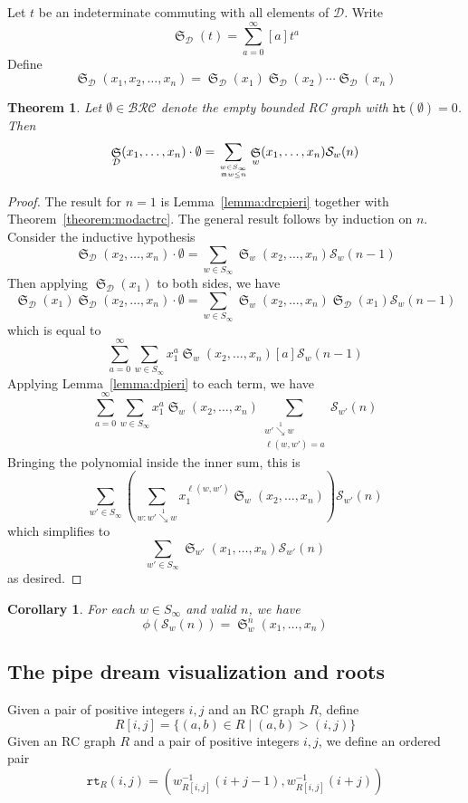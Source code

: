 \documentclass{amsart}
\newtheorem{corollary}[lemma]{Corollary}
\newtheorem{theorem}{Theorem}[section]
\theoremstyle{definition}
\theoremstyle{remark}
\numberwithin{equation}{subsection}
\DeclareMathOperator{\sch}{\mathfrak{S}}
\newcommand{\downvar}[1]{\stackrel{#1}{\searrow}}
\newcommand{\wof}[1]{w_{#1}}
\newcommand{\rtt}{\mathtt{rt}}
\newcommand{\hr}{\mathtt{ht}}
\newcommand{\BRC}{\mathcal{BRC}}
\newcommand{\dcoma}{\mathcal{D}}
\newcommand{\maxd}{\mathfrak{m}}
\begin{document}
Let $t$ be an indeterminate commuting with all elements of $\dcoma$. Write
$$\sch_\dcoma(t) = \sum_{a=0}^\infty [a]t^a$$
Define
$$\sch_\dcoma(x_1,x_2,\ldots,x_n) = \sch_\dcoma(x_1)\sch_\dcoma(x_2)\cdots \sch_\dcoma(x_n)$$

\begin{theorem}
	Let $\emptyset\in \BRC$ denote the empty bounded RC graph with $\hr(\emptyset)=0$. Then
	$$\sch_\dcoma(x_1,\ldots,x_n)\cdot \emptyset=\sum_{w\in S_\infty\atop\maxd{w}\leq n}\sch_w(x_1,\ldots,x_n)\mathcal{S}_w(n)$$
\end{theorem}
\begin{proof}
	The result for $n=1$ is Lemma~\ref{lemma:drcpieri} together with Theorem~\ref{theorem:modactrc}. The general result follows by induction on $n$. Consider the inductive hypothesis
	$$\sch_\dcoma(x_2,\ldots,x_n)\cdot \emptyset=\sum_{w\in S_\infty}\sch_w(x_2,\ldots,x_n)\mathcal{S}_w(n-1)$$
	Then applying $\sch_\dcoma(x_1)$ to both sides, we have
	$$\sch_\dcoma(x_1)\sch_\dcoma(x_2,\ldots,x_n)\cdot \emptyset=\sum_{w\in S_\infty}\sch_w(x_2,\ldots,x_n)\sch_\dcoma(x_1)\mathcal{S}_w(n-1)$$
	which is equal to
	$$\sum_{a=0}^\infty\sum_{w\in S_\infty}x_1^a\sch_w(x_2,\ldots,x_n)[a]\mathcal{S}_w(n-1)$$
	Applying Lemma~\ref{lemma:dpieri} to each term, we have
	$$\sum_{a=0}^\infty\sum_{w\in S_\infty}x_1^a\sch_w(x_2,\ldots,x_n)\sum_{\substack{w'\downvar{1} w\\\ell(w,w')=a}} \mathcal{S}_{w'}(n)$$
	Bringing the polynomial inside the inner sum, this is
	$$\sum_{w'\in S_\infty}\left(\sum_{w:w'\downvar{1}w} x_1^{\ell(w,w')}\sch_w(x_2,\ldots,x_n)\right)\mathcal{S}_{w'}(n)$$
	which simplifies to
	$$\sum_{w'\in S_\infty}\sch_{w'}(x_1,\ldots,x_n)\mathcal{S}_{w'}(n)$$
	as desired.
\end{proof}

\begin{corollary}
	For each $w\in S_\infty$ and valid $n$, we have
	$$\phi(\mathcal{S}_w(n)) = \sch_w^n(x_1,\ldots,x_n)$$
\end{corollary}

\subsection{The pipe dream visualization and roots}

Given a pair of positive integers $i,j$ and an RC graph $R$, define 
$$R[i, j]=\{(a, b)\in R\mid (a, b) > (i, j)\}$$
Given an RC graph $R$ and a pair of positive integers $i, j$, we define an ordered pair
$$\rtt_R(i,j)=(\wof{R[i, j]}^{-1}(i + j - 1), \wof{R[i,j]}^{-1}(i+j))$$
\end{document}
